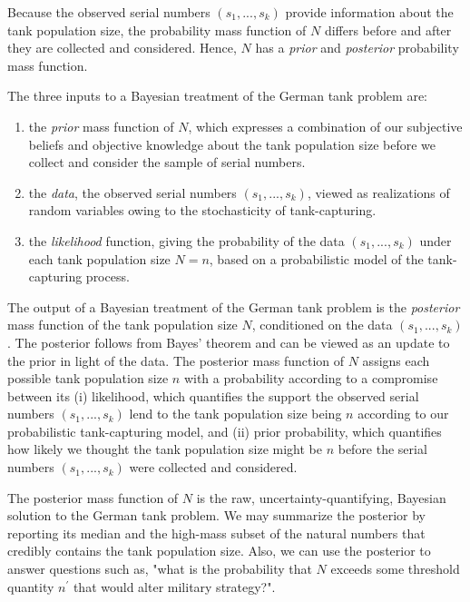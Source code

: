 \documentclass[11pt, oneside]{article}
\newcommand{\data}{$(s_1, ..., s_k)$\xspace}
\begin{document}
Because the observed serial numbers \data provide information about the tank population size, the probability mass function of $N$ differs before and after they are collected and considered. Hence, $N$ has a \emph{prior} and \emph{posterior} probability mass function. 

The three inputs to a Bayesian treatment of the German tank problem are: 
\begin{enumerate}
	\item the \emph{prior} mass function of $N$, which expresses a combination of our subjective beliefs and objective knowledge about the tank population size before we collect and consider the sample of serial numbers.
	\item the \emph{data}, the observed serial numbers \data, viewed as realizations of random variables owing to the stochasticity of tank-capturing.
	\item the \emph{likelihood} function, giving the probability of the data \data under each tank population size $N=n$, based on a probabilistic model of the tank-capturing process.
\end{enumerate}

The output of a Bayesian treatment of the German tank problem is the \emph{posterior} mass function of the tank population size $N$, conditioned on the data \data. The posterior follows from Bayes' theorem and can be viewed as an update to the prior in light of the data.
The posterior mass function of $N$ assigns each possible tank population size $n$ with a probability according to a compromise between its
(i) likelihood, which quantifies the support the observed serial numbers \data lend to the tank population size being $n$ according to our probabilistic tank-capturing model, 
and 
(ii) prior probability, which quantifies how likely we thought the tank population size might be $n$ before the serial numbers \data were collected and considered. \cite{van2021bayesian}

The posterior mass function of $N$ is the raw, uncertainty-quantifying, Bayesian solution to the German tank problem. We may summarize the posterior by reporting its median and the high-mass subset of the natural numbers that credibly contains the tank population size. Also, we can use the posterior to answer questions such as, "what is the probability that $N$ exceeds some threshold quantity $n^\prime$ that would alter military strategy?".
\end{document}
